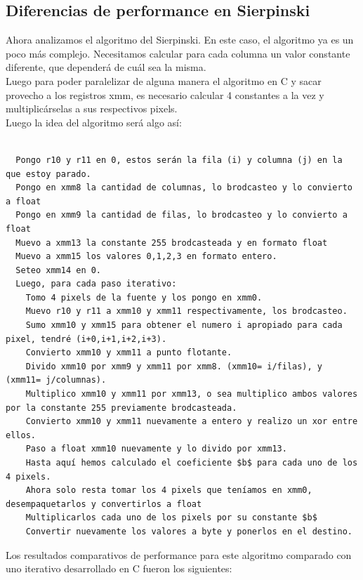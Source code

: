 \documentclass[a4paper]{article}
\begin{document}
\subsection{Diferencias de performance en Sierpinski}
Ahora analizamos el algoritmo del Sierpinski. En este caso, el algoritmo ya es un poco más complejo. Necesitamos calcular para cada columna un valor constante diferente, que dependerá de cuál sea la misma.
\\
Luego para poder paralelizar de alguna manera el algoritmo en C y sacar provecho a los registros xmm, es necesario calcular 4 constantes a la vez y multiplicárselas a sus respectivos pixels.
\\
Luego la idea del algoritmo será algo así:
\begin{codesnippet}
\begin{verbatim}

  Pongo r10 y r11 en 0, estos serán la fila (i) y columna (j) en la que estoy parado.
  Pongo en xmm8 la cantidad de columnas, lo brodcasteo y lo convierto a float
  Pongo en xmm9 la cantidad de filas, lo brodcasteo y lo convierto a float
  Muevo a xmm13 la constante 255 brodcasteada y en formato float
  Muevo a xmm15 los valores 0,1,2,3 en formato entero.
  Seteo xmm14 en 0.
  Luego, para cada paso iterativo:
    Tomo 4 pixels de la fuente y los pongo en xmm0.
    Muevo r10 y r11 a xmm10 y xmm11 respectivamente, los brodcasteo.
    Sumo xmm10 y xmm15 para obtener el numero i apropiado para cada pixel, tendré (i+0,i+1,i+2,i+3).
    Convierto xmm10 y xmm11 a punto flotante.
    Divido xmm10 por xmm9 y xmm11 por xmm8. (xmm10= i/filas), y (xmm11= j/columnas).
    Multiplico xmm10 y xmm11 por xmm13, o sea multiplico ambos valores por la constante 255 previamente brodcasteada.
    Convierto xmm10 y xmm11 nuevamente a entero y realizo un xor entre ellos.
    Paso a float xmm10 nuevamente y lo divido por xmm13.
    Hasta aquí hemos calculado el coeficiente $b$ para cada uno de los 4 pixels.
    Ahora solo resta tomar los 4 pixels que teníamos en xmm0, desempaquetarlos y convertirlos a float
    Multiplicarlos cada uno de los pixels por su constante $b$
    Convertir nuevamente los valores a byte y ponerlos en el destino.
\end{verbatim}
\end{codesnippet}

Los resultados comparativos de performance para este algoritmo comparado con uno iterativo desarrollado en C fueron los siguientes:
\end{document}
